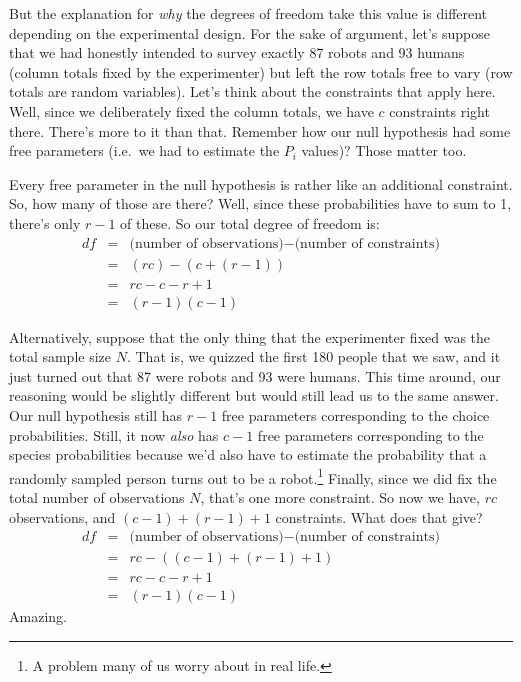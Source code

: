 \documentclass[
]{book}
\theoremstyle{definition}
\theoremstyle{definition}
\theoremstyle{definition}
\theoremstyle{definition}
\theoremstyle{remark}
\begin{document}
But the explanation for \emph{why} the degrees of freedom take this value is different depending on the experimental design. For the sake of argument, let's suppose that we had honestly intended to survey exactly 87 robots and 93 humans (column totals fixed by the experimenter) but left the row totals free to vary (row totals are random variables). Let's think about the constraints that apply here. Well, since we deliberately fixed the column totals, we have \(c\) constraints right there. There's more to it than that. Remember how our null hypothesis had some free parameters (i.e.~we had to estimate the \(P_i\) values)? Those matter too.

Every free parameter in the null hypothesis is rather like an additional constraint. So, how many of those are there? Well, since these probabilities have to sum to 1, there's only \(r-1\) of these. So our total degree of freedom is:
\[
\begin{array}{rcl}
df &=& \mbox{(number of observations)} - \mbox{(number of constraints)} \\
&=& (rc) - (c + (r-1)) \\
&=& rc - c - r + 1 \\
&=& (r - 1)(c - 1)
\end{array}
\]

Alternatively, suppose that the only thing that the experimenter fixed was the total sample size \(N\). That is, we quizzed the first 180 people that we saw, and it just turned out that 87 were robots and 93 were humans. This time around, our reasoning would be slightly different but would still lead us to the same answer. Our null hypothesis still has \(r-1\) free parameters corresponding to the choice probabilities. Still, it now \emph{also} has \(c-1\) free parameters corresponding to the species probabilities because we'd also have to estimate the probability that a randomly sampled person turns out to be a robot.\footnote{A problem many of us worry about in real life.} Finally, since we did fix the total number of observations \(N\), that's one more constraint. So now we have, \(rc\) observations, and \((c-1) + (r-1) + 1\) constraints. What does that give?
\[
\begin{array}{rcl}
df &=& \mbox{(number of observations)} - \mbox{(number of constraints)} \\
&=& rc - ( (c-1) + (r-1) + 1) \\
&=& rc - c - r + 1 \\
&=& (r - 1)(c - 1)
\end{array}
\]
Amazing.
\end{document}
